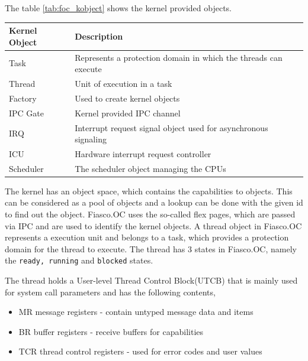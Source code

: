 The table \ref{tab:foc_kobject} shows the kernel provided objects.
\begin{center}
\begin{tabular}{|l|p{10cm}|}
\hline 
\textbf{ Kernel Object} & \textbf{Description} \\ \hline

Task & Represents a protection domain in which the threads can execute\\ \hline

Thread & Unit of execution in a task
\\ \hline

Factory & Used to create kernel objects \\ \hline

IPC Gate &  Kernel provided IPC channel\\ \hline

IRQ & Interrupt request signal object used for asynchronous signaling\\ \hline

ICU & Hardware interrupt request controller \\ \hline

Scheduler &  The scheduler object managing the CPUs \\ \hline
\end{tabular}
\label{tab:foc_kobject}
\end{center}

The kernel has an object space, which contains the capabilities to objects. This can be considered as a pool of objects and a lookup can be done with the given id to find out the object. Fiasco.OC uses the so-called flex pages, which are passed via IPC and are used to identify the kernel objects. A thread object in Fiasco.OC represents a execution unit and belongs to a task, which provides a protection domain for the thread to execute. The thread has 3 states in Fiasco.OC, namely the \texttt{ready, running} and \texttt{blocked} states. 

The thread holds a User-level Thread Control Block(UTCB) that is mainly used for system call parameters and has the following contents,
\begin{itemize}
\item MR message registers - contain untyped message data and items

\item BR buffer registers - receive buffers for capabilities

\item TCR thread control registers - used for error codes and user values
\end{itemize}

